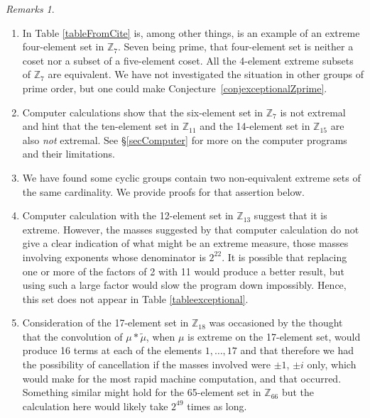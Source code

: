 \documentclass[letter,11pt]{amsart}
\numberwithin{theorem}{section}
\theoremstyle{remark}
\newtheorem{rems}[theorem]{Remarks}
\numberwithin{equation}{section}
\newcommand{\conjref}[1]{Conjecture~\ref{#1}}
\newcommand{\refitem}[1]{(\ref{#1})}
\newcommand{\secref}[1]{\S\ref{#1}}
\newcommand\Zp[2]{\texttt{$\mathbb Z_{#1}^{\	#2}$}}
\begin{document}
\begin{rems}\label{remsReTables}
\begin{enumerate}

A dagger (\dag) indicates that the set is discussed in Section \secref{secProofs}.

\item 
In Table \ref{tableFromCite} is, among other things, is an example of an extreme 
 four-element set in \Zp7{}. Seven being prime, that four-element 
 set is neither a coset nor a subset of a five-element coset. All the 4-element
 extreme subsets of \Zp7{} are equivalent.
 We have not investigated the situation in  other groups of prime order, but one could make \conjref{conjexceptionalZprime}.




 
\item \label{itSixInSeven} Computer calculations show that the six-element set in \Zp7{} is
not extremal and hint that the ten-element set in \Zp{11}{} and the 14-element set in \Zp{15}{} are
also 
\emph{not}  extremal. See  \secref{secComputer} for more on the computer programs and their limitations. 

\item We have found some cyclic 
groups contain two non-equivalent extreme sets of the same cardinality. We provide proofs
for that assertion below. 

\item Computer calculation with the 12-element set in \Zp{13}{} suggest that it is 
extreme.  
 However, the masses suggested by that
 computer calculation do not give a clear indication of what might be an extreme measure,
 those masses involving exponents whose denominator is $2^{22}$. It is possible that replacing
  one or more of the factors of 2 with 11 would produce a better result, but using 
 such a large factor would slow the program down impossibly. Hence, this set does not appear in 
 Table \ref{tableexceptional}.
 

\item\label{remRealExtremtransform}
 Consideration of the 17-element set in \Zp{18}{} was occasioned 
by the thought that the convolution of
$\mu*\tilde\mu$, when $\mu$ is extreme on the 17-element set, would produce 16 terms at each of
the elements $1,\dots,17$ and that therefore we had the possibility of cancellation if the masses involved were $\pm 1$, $\pm i$ only, which would make for the most rapid machine computation, and that occurred. Something similar might hold for the 65-element set in \Zp{66}{} but the calculation here would likely take $2^{49}$ times as long.



\end{enumerate}
\end{rems}
\end{document}
